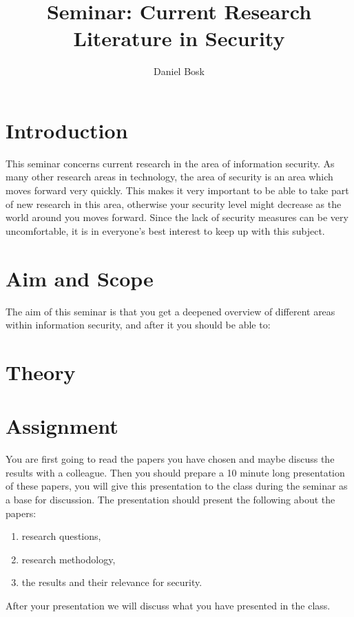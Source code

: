 \documentclass[a4paper]{llncs}
\title{Seminar: Current Research Literature in Security}
\author{%
  Daniel Bosk
}
\institute{%
  Department of Information and Communication Systems\\
  Mid Sweden University, Sundsvall
}
\begin{document}
\maketitle


\section{Introduction}%
\label{sec:Introduction}

This seminar concerns current research in the area of information security.
As many other research areas in technology, the area of security is an area 
which moves forward very quickly.
This makes it very important to be able to take part of new research in this 
area, otherwise your security level might decrease as the world around you 
moves forward.
Since the lack of security measures can be very uncomfortable, it is in 
everyone's best interest to keep up with this subject.


\section{Aim and Scope}%
\label{sec:Syfte}

The aim of this seminar is that you get a deepened overview of different areas 
within information security, and after it you should be able to:
\begin{itemize}
	
\end{itemize}


\section{Theory}%
\label{sec:Theory}




\section{Assignment}

You are first going to read the papers you have chosen and maybe discuss the 
results with a colleague.
Then you should prepare a 10 minute long presentation of these papers, you will 
give this presentation to the class during the seminar as a base for 
discussion.
The presentation should present the following about the papers:
\begin{enumerate}
  \item research questions,
  \item research methodology,
  \item the results and their relevance for security.
\end{enumerate}
After your presentation we will discuss what you have presented in the class.
\end{document}
